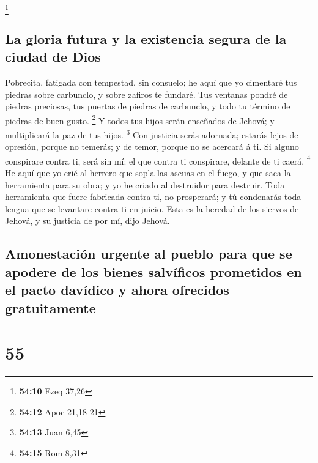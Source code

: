 \footnote{\textbf{54:10} Ezeq 37,26}

\hypertarget{la-gloria-futura-y-la-existencia-segura-de-la-ciudad-de-dios}{%
\subsection{La gloria futura y la existencia segura de la ciudad de
Dios}\label{la-gloria-futura-y-la-existencia-segura-de-la-ciudad-de-dios}}

 Pobrecita, fatigada con tempestad, sin consuelo; he aquí
que yo cimentaré tus piedras sobre carbunclo, y sobre zafiros te
fundaré.  Tus ventanas pondré de piedras preciosas, tus
puertas de piedras de carbunclo, y todo tu término de piedras de buen
gusto. \footnote{\textbf{54:12} Apoc 21,18-21}  Y todos
tus hijos serán enseñados de Jehová; y multiplicará la paz de tus hijos.
\footnote{\textbf{54:13} Juan 6,45}  Con justicia serás
adornada; estarás lejos de opresión, porque no temerás; y de temor,
porque no se acercará á ti.  Si alguno conspirare contra
ti, será sin mí: el que contra ti conspirare, delante de ti caerá.
\footnote{\textbf{54:15} Rom 8,31}  He aquí que yo crié
al herrero que sopla las ascuas en el fuego, y que saca la herramienta
para su obra; y yo he criado al destruidor para destruir.
 Toda herramienta que fuere fabricada contra ti, no
prosperará; y tú condenarás toda lengua que se levantare contra ti en
juicio. Esta es la heredad de los siervos de Jehová, y su justicia de
por mí, dijo Jehová.

\hypertarget{amonestaciuxf3n-urgente-al-pueblo-para-que-se-apodere-de-los-bienes-salvuxedficos-prometidos-en-el-pacto-davuxeddico-y-ahora-ofrecidos-gratuitamente}{%
\subsection{Amonestación urgente al pueblo para que se apodere de los
bienes salvíficos prometidos en el pacto davídico y ahora ofrecidos
gratuitamente}\label{amonestaciuxf3n-urgente-al-pueblo-para-que-se-apodere-de-los-bienes-salvuxedficos-prometidos-en-el-pacto-davuxeddico-y-ahora-ofrecidos-gratuitamente}}

\hypertarget{section-54}{%
\section{55}\label{section-54}}

